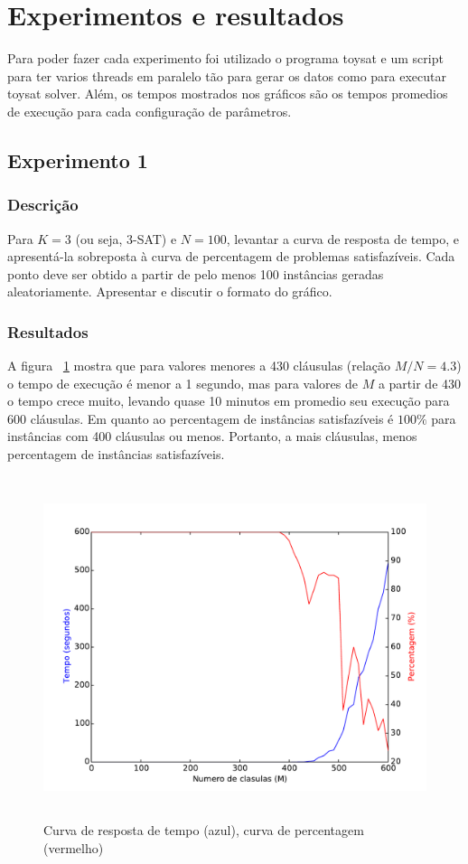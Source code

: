 \section{Experimentos e resultados} 

Para poder fazer cada experimento foi utilizado o programa toysat \cite{ToySAT14} e um script para ter varios threads em paralelo tão para gerar os datos como para executar toysat solver. Além, os tempos mostrados nos gráficos são os tempos promedios de execução para cada configuração de parâmetros.

\subsection{Experimento 1}
	\subsubsection{Descrição}
		Para $K = 3$ (ou seja, 3-SAT) e $N = 100$, levantar a curva de resposta de tempo, e apresentá-la sobreposta à curva de percentagem de problemas satisfazíveis. Cada ponto deve ser obtido a partir de pelo menos 100 instâncias geradas aleatoriamente. Apresentar e discutir o formato do gráfico.
	\subsubsection{Resultados}
	\label{subsec:resultadosExp1}
		A figura ~\ref{fig:max3sat100at} mostra que para valores menores a 430 cláusulas (relação $M/N=4.3$) o tempo de execução é menor a 1 segundo, mas para valores de $M$ a partir de 430 o tempo crece muito, levando quase 10 minutos em promedio seu execução para 600 cláusulas. Em quanto ao percentagem de instâncias satisfazíveis é $100\%$ para instâncias com 400 cláusulas ou menos. Portanto, a mais cláusulas, menos percentagem de instâncias satisfazíveis.
		\begin{figure}[H]
			\centering
			\includegraphics[height=10cm]{images/max3sat_100at}
			\caption{Curva de resposta de tempo (azul), curva de percentagem (vermelho)}
			\label{fig:max3sat100at}
		\end{figure}
		
